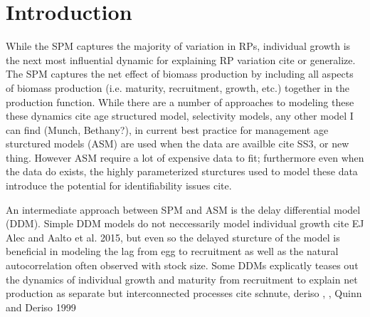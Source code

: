 %
\newcommand{\kr}{ \frac{\kappa w_\infty}{w(a_s)} }
\newcommand{\one}{
        \left(\frac{Z(Z+\kappa)}{\alpha w(a_s)(Z+\kr)}\right)^\gamma
}
\newcommand{\two}{
        \left(\frac{\gamma F}{\alpha w(a_s)}\right) \left(\frac{Z(Z+\kappa)}{\alpha w(a_s)(Z+\kr)}\right)^{\gamma-1}
}
\newcommand{\thr}{
        \frac{\left(\kr\right)\left(\kappa-\kr\right)}{(Z+\kr)^2}
}
%
\newcommand{\oneA}{
        \left(\frac{Z^*(Z^*+\kappa)}{w(a_s)(Z^*+\kr)}\right)^\gamma
}
\newcommand{\twoA}{
        \left(\frac{\gamma F^*}{w(a_s)}\right) \left(\frac{Z^*(Z^*+\kappa)}{w(a_s)(Z^*+\kr)}\right)^{\gamma-1}
}
\newcommand{\thrA}{
        \frac{\left(\kr\right)\left(\kappa-\kr\right)}{(Z^*+\kr)^2}
}



%
\section{Introduction}

%
While the SPM captures the majority of variation in RPs, individual growth is 
the next most influential dynamic for explaining RP variation {\color{red}cite 
or generalize}. The SPM captures the net effect of biomass production by 
including all aspects of biomass production (i.e. maturity, recruitment, 
growth, etc.) together in the production function. While there are a number of 
approaches to modeling these these dynamics {\color{red}cite age structured model, 
selectivity models, any other model I can find (Munch, Bethany?)}, in current best 
practice for management age sturctured models (ASM) are used when the data are 
availble {\color{red} cite SS3, or new thing}. However ASM require a lot of expensive 
data to fit; furthermore even when the data do exists, the highly parameterized 
sturctures used to model these data introduce the potential for identifiability issues {\color{red} cite}.

%
An intermediate approach between SPM and ASM is the delay differential model 
(DDM). Simple DDM models do not neccessarily model individual growth {\color{red}cite EJ Alec and Aalto et al. 2015}, 
but even so the delayed sturcture of the model is beneficial in modeling the lag from egg to recruitment as well as
the natural autocorrelation often observed with stock size. Some DDMs explicatly teases 
out the dynamics of individual growth and maturity from recruitment to explain net production 
as separate but interconnected processes {\color{red} cite schnute, deriso \cite{walters_continuous_2020}, \cite[pg. 334]{hilborn_quantitative_1992}, Quinn and Deriso 1999}

